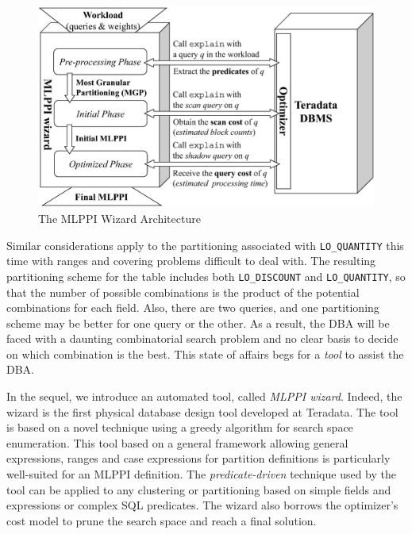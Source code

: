\documentclass[paper]{ieice}
\begin{document}
\begin{figure}[t!]
\centering
\includegraphics[scale=0.5]{architecture}
\caption{The MLPPI Wizard Architecture\label{fig:arch}}
\end{figure}

Similar considerations apply to the partitioning associated with {\tt LO\_QUANTITY} 
this time with ranges and covering problems difficult to deal with. 
The resulting partitioning scheme for the table includes both {\tt LO\_DISCOUNT}
and {\tt LO\_QUANTITY}, so that the number of possible combinations is the product of 
the potential combinations for each field. 
Also, there are two queries, and one partitioning scheme may be better for one query or the other. 
As a result, the DBA will be faced with a daunting combinatorial search problem 
and no clear basis to decide on which combination is the best. 
This state of affairs begs for a {\em tool} to assist the DBA.

In the sequel, we introduce an automated tool, called {\em MLPPI wizard}. 
Indeed, the \hbox{wizard} is the first physical database design tool 
developed at Teradata.
The tool is based on a novel technique using a greedy algorithm for 
search space enumeration. 
This tool based on a general framework allowing general expressions, 
ranges and case expressions for \hbox{partition} \hbox{definitions} 
is particularly well-suited for an MLPPI definition. \linebreak
The {\em predicate-driven} \hbox{technique} used by the tool can be applied 
to any clustering or partitioning based on simple fields and expressions or complex SQL predicates. 
The wizard also borrows the optimizer's cost model 
to prune the search space and reach a final solution. 
\end{document}
